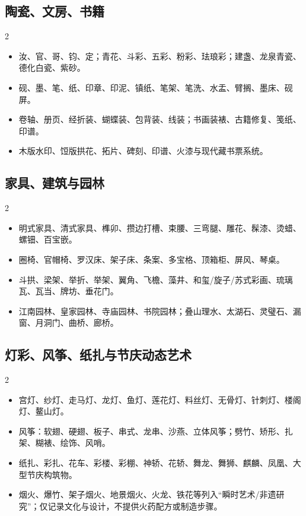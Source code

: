 \documentclass[lang=en,a4paper,11pt]{elegantpaper}
\begin{document}
\subsection{陶瓷、文房、书籍}


\begin{multicols}{2}
\begin{itemize}
\item 汝、官、哥、钧、定；青花、斗彩、五彩、粉彩、珐琅彩；建盏、龙泉青瓷、德化白瓷、紫砂。
\item 砚、墨、笔、纸、印章、印泥、镇纸、笔架、笔洗、水盂、臂搁、墨床、砚屏。
\item 卷轴、册页、经折装、蝴蝶装、包背装、线装；书画装裱、古籍修复、笺纸、印谱。
\item 木版水印、饾版拱花、拓片、碑刻、印谱、火漆与现代藏书票系统。
\end{itemize}
\end{multicols}

\subsection{家具、建筑与园林}


\begin{multicols}{2}
\begin{itemize}
\item 明式家具、清式家具、榫卯、攒边打槽、束腰、三弯腿、雕花、髹漆、烫蜡、螺钿、百宝嵌。
\item 圈椅、官帽椅、罗汉床、架子床、条案、多宝格、顶箱柜、屏风、琴桌。
\item 斗拱、梁架、举折、举架、翼角、飞檐、藻井、和玺/旋子/苏式彩画、琉璃瓦、瓦当、牌坊、垂花门。
\item 江南园林、皇家园林、寺庙园林、书院园林；叠山理水、太湖石、灵璧石、漏窗、月洞门、曲桥、廊桥。
\end{itemize}
\end{multicols}

\subsection{灯彩、风筝、纸扎与节庆动态艺术}


\begin{multicols}{2}
\begin{itemize}
\item 宫灯、纱灯、走马灯、龙灯、鱼灯、莲花灯、料丝灯、无骨灯、针刺灯、楼阁灯、鳌山灯。
\item 风筝：软翅、硬翅、板子、串式、龙串、沙燕、立体风筝；劈竹、矫形、扎架、糊裱、绘饰、风哨。
\item 纸扎、彩扎、花车、彩楼、彩棚、神轿、花轿、舞龙、舞狮、麒麟、凤凰、大型节庆构筑物。
\item 烟火、爆竹、架子烟火、地景烟火、火龙、铁花等列入“瞬时艺术/非遗研究”；仅记录文化与设计，不提供火药配方或制造步骤。
\end{itemize}
\end{multicols}
\end{document}
